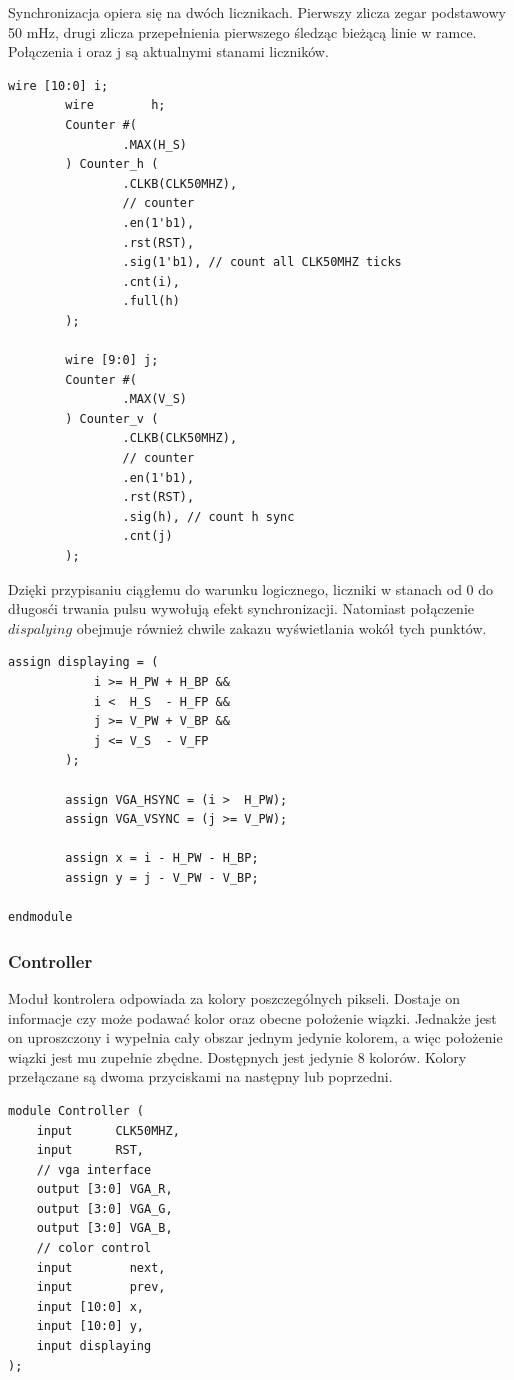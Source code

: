 \documentclass[a4paper,12pt]{article}
\begin{document}
Synchronizacja opiera się na dwóch licznikach. Pierwszy zlicza zegar podstawowy 50 mHz, drugi zlicza przepełnienia pierwszego śledząc bieżącą linie w ramce. Połączenia i oraz j są aktualnymi stanami liczników.
\begin{lstlisting}[label=Syncvga,caption=Sync.v,firstnumber=23]
        wire [10:0] i;
        wire        h;
        Counter #(
                .MAX(H_S)
        ) Counter_h (
                .CLKB(CLK50MHZ),
                // counter
                .en(1'b1),
                .rst(RST),
                .sig(1'b1), // count all CLK50MHZ ticks
                .cnt(i),
                .full(h)
        );

        wire [9:0] j;
        Counter #(
                .MAX(V_S)
        ) Counter_v (
                .CLKB(CLK50MHZ),
                // counter
                .en(1'b1),
                .rst(RST),
                .sig(h), // count h sync
                .cnt(j)
        );
\end{lstlisting}

Dzięki przypisaniu ciągłemu do warunku logicznego, liczniki w stanach od 0 do długosći trwania pulsu wywołują efekt synchronizacji. Natomiast połączenie $dispalying$ obejmuje również chwile zakazu wyświetlania wokół tych punktów.
\begin{lstlisting}[label=Syncvga,caption=Sync.v,firstnumber=49]
        assign displaying = (
            i >= H_PW + H_BP &&
            i <  H_S  - H_FP &&
            j >= V_PW + V_BP &&
            j <= V_S  - V_FP
        );

        assign VGA_HSYNC = (i >  H_PW);
        assign VGA_VSYNC = (j >= V_PW);

        assign x = i - H_PW - H_BP;
        assign y = j - V_PW - V_BP;

endmodule
\end{lstlisting}

\subsubsection{Controller}

Moduł kontrolera odpowiada za kolory poszczególnych pikseli. Dostaje on informacje czy może podawać kolor oraz obecne położenie wiązki. Jednakże jest on uproszczony i wypełnia cały obszar jednym jedynie kolorem, a więc  położenie wiązki jest mu zupełnie zbędne. Dostępnych jest jedynie 8 kolorów. Kolory przełączane są dwoma przyciskami na następny lub poprzedni.
\begin{lstlisting}[label=Syncvga,caption=Sync.v,firstnumber=49]
module Controller (
    input      CLK50MHZ,
    input      RST,
    // vga interface
    output [3:0] VGA_R,
    output [3:0] VGA_G,
    output [3:0] VGA_B,
    // color control
    input        next,
    input        prev,
    input [10:0] x,
    input [10:0] y,
    input displaying
);
\end{lstlisting}
\end{document}
